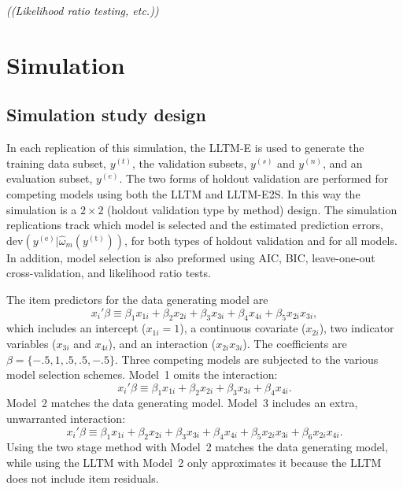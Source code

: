\emph{((Likelihood ratio testing, etc.))}


\section{Simulation}


\subsection{Simulation study design}

In each replication of this simulation, the LLTM-E is used to generate the training data subset, $y^{(t)}$, the validation subsets, $y^{(s)}$ and $y^{(n)}$, and an evaluation subset, $y^{(e)}$. The two forms of holdout validation are performed for competing models using both the LLTM and LLTM-E2S. In this way the simulation is a $2 \times 2$ (holdout validation type by method) design. 
The simulation replications track which model is selected and the estimated prediction errors, 
	$\mathrm{dev}(y^{(\mathrm{e})} | \hat \omega_{m}(y^{(\mathrm{t})}))$,
for both types of holdout validation and for all models.
In addition, model selection is also preformed using AIC, BIC, leave-one-out cross-validation, and likelihood ratio tests.

The item predictors for the data generating model are
\begin{equation} 
	x_i'\beta \equiv \beta_1 x_{1i} + \beta_2 x_{2i} + \beta_3 x_{3i} + \beta_4 x_{4i} + 
		\beta_5 x_{2i} x_{3i}
,\end{equation}
which includes an intercept ($x_{1i} = 1$), a continuous covariate ($x_{2i}$), two indicator variables ($x_{3i}$ and $x_{4i}$), and an interaction ($x_{2i} x_{3i}$). The coefficients are 
$\beta = \{-.5, 1, .5, .5, -.5\}$. Three competing models are subjected to the various model selection schemes. Model~1 omits the interaction:
\begin{equation} 
	x_i'\beta \equiv \beta_1 x_{1i} + \beta_2 x_{2i} + \beta_3 x_{3i} + \beta_4 x_{4i}
.\end{equation}
Model~2 matches the data generating model.
Model~3 includes an extra, unwarranted interaction:
\begin{equation} 
	x_i'\beta \equiv \beta_1 x_{1i} + \beta_2 x_{2i} + \beta_3 x_{3i} + \beta_4 x_{4i} + 
		\beta_5 x_{2i} x_{3i} + \beta_6 x_{2i} x_{4i}
.\end{equation}
Using the two stage method with Model~2 matches the data generating model, while using the LLTM with Model~2 only approximates it because the LLTM does not include item residuals.

